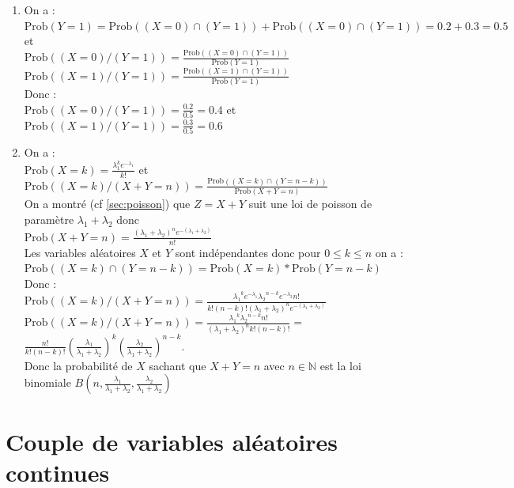 \documentclass[a4paper,11pt]{book}
\newcommand{\N}{{\mathbb{N}}}
\begin{document}
\begin{enumerate}
\item On a :\\
$\mbox{Prob}(Y=1)=\mbox{Prob}((X=0)\cap(Y=1))+\mbox{Prob}((X=0)\cap(Y=1))=0.2+0.3=0.5$ et \\
$\displaystyle \mbox{Prob}((X=0)/(Y=1))=\frac{\mbox{Prob}((X=0)\cap(Y=1))}{\mbox{Prob}(Y=1)}$\\
$\displaystyle \mbox{Prob}((X=1)/(Y=1))=\frac{\mbox{Prob}((X=1)\cap(Y=1))}{\mbox{Prob}(Y=1)}$\\
Donc :\\
$\displaystyle \mbox{Prob}((X=0)/(Y=1))=\frac{0.2}{0.5}=0.4$ et\\
$\displaystyle \mbox{Prob}((X=1)/(Y=1))=\frac{0.3}{0.5}=0.6$

\item On a :\\
$\displaystyle \mbox{Prob}(X=k)=\frac{\lambda_1^ke^{-\lambda_1}}{k!}$ et \\
$\displaystyle \mbox{Prob}((X=k)/(X+Y=n))=\frac{\mbox{Prob}((X=k)\cap(Y=n-k))}{\mbox{Prob}(X+Y=n)}$\\
On a montr\'e (cf \ref{sec:poisson}) que $Z=X+Y$ suit une loi de poisson de 
param\`etre $\lambda_1+\lambda_2$ donc\\
$\displaystyle \mbox{Prob}(X+Y=n)=\frac{{(\lambda_1+\lambda_2)}^ne^{-(\lambda_1+\lambda_2)}}{n!}$\\
Les variables al\'eatoires $X$ et $Y$ sont ind\'ependantes donc pour $0\leq k \leq n$ on a :\\
$\mbox{Prob}((X=k)\cap(Y=n-k))=\mbox{Prob}(X=k)*\mbox{Prob}(Y=n-k)$\\
Donc :\\
$\displaystyle \mbox{Prob}((X=k)/(X+Y=n))=\frac{{\lambda_1}^ke^{-\lambda_1}{\lambda_2}^{n-k}e^{-\lambda_2}n!}{k!(n-k)!{(\lambda_1+\lambda_2)}^ne^{-(\lambda_1+\lambda_2)}}$\\
$\displaystyle \mbox{Prob}((X=k)/(X+Y=n))=\frac{{\lambda_1}^k{\lambda_2}^{n-k}n!}{{(\lambda_1+\lambda_2)}^nk!(n-k)!}=$\\
$\displaystyle \frac{n!}{k!(n-k)!}{(\frac{\lambda_1}{\lambda_1+\lambda_2})}^k{(\frac{\lambda_2}{\lambda_1+\lambda_2})}^{n-k}$.\\
Donc la probabilit\'e de $X$ sachant que $X+Y=n$ avec $n \in \N$ est la loi 
binomiale $\displaystyle B(n,\frac{\lambda_1}{\lambda_1+\lambda_2},\frac{\lambda_2}{\lambda_1+\lambda_2})$
\end{enumerate}
\section{Couple de variables al\'eatoires continues}
\end{document}
